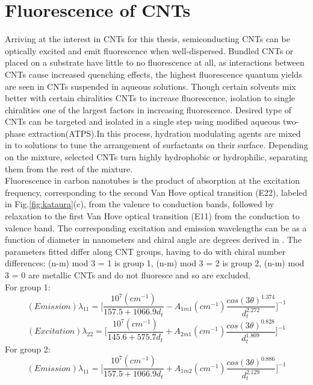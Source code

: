 \section{Fluorescence of CNTs}
Arriving at the interest in CNTs for this thesis, semiconducting CNTs can be optically excited and emit fluorescence\cite{hendler} when well-dispersed. Bundled CNTs or placed on a substrate have little to no fluorescence at all, as interactions between CNTs cause increased quenching effects, the highest fluorescence quantum yields are seen in CNTs suspended in aqueous solutions. Though certain solvents mix better with certain chiralities CNTs to increase fluorescence, isolation to single chiralities one of the largest factors in increasing fluorescence. Desired type of CNTs can be targeted and isolated in a single step using modified aqueous two-phase extraction(ATPS)\cite{turek}.In this process, hydration modulating agents are mixed in to solutions to tune the arrangement of surfactants on their surface. Depending on the mixture, selected CNTs turn highly hydrophobic or hydrophilic, separating them from the rest of the mixture.\\
Fluorescence in carbon nanotubes is the product of absorption at the excitation frequency, corresponding to the second Van Hove optical transition (E22), labeled in Fig.\ref{fig:kataura}(c), from the valence to conduction bands, followed by relaxation to the first Van Hove optical transition (E11) from the conduction to valence band. The corresponding excitation and emission  wavelengths can be as a function of diameter in nanometers and chiral angle are degrees derived in \cite{bachilo}. The parameters fitted differ along CNT groups, having to do with chiral number differences:  (n-m) mod 3 = 1 is group 1, (n-m) mod 3 = 2 is group 2,  (n-m) mod 3 = 0 are metallic CNTs and do not fluoresce and so are excluded. \\
For group 1:
\begin{equation}
	(Emission)\lambda_{11} = \Bigg[\frac{10^7(cm^{-1})}{157.5+1066.9d_t} - A_{1m1}(cm^{-1})\frac{cos(3\theta)^{1.374}}{d_t^{2.272}} \Bigg]^{-1}
\end{equation}
\begin{equation}
	(Excitation)\lambda_{22} = \Bigg[\frac{10^7(cm^{-1})}{145.6+575.7d_t} + A_{2m1}(cm^{-1})\frac{cos(3\theta)^{0.828}}{d_t^{1.809}} \Bigg]^{-1}
\end{equation}
For group 2:
\begin{equation}
	(Emission)\lambda_{11} = \Bigg[\frac{10^7(cm^{-1})}{157.5+1066.9d_t} + A_{1m2}(cm^{-1})\frac{cos(3\theta)^{0.886}}{d_t^{2.129}} \Bigg]^{-1}
\end{equation}
